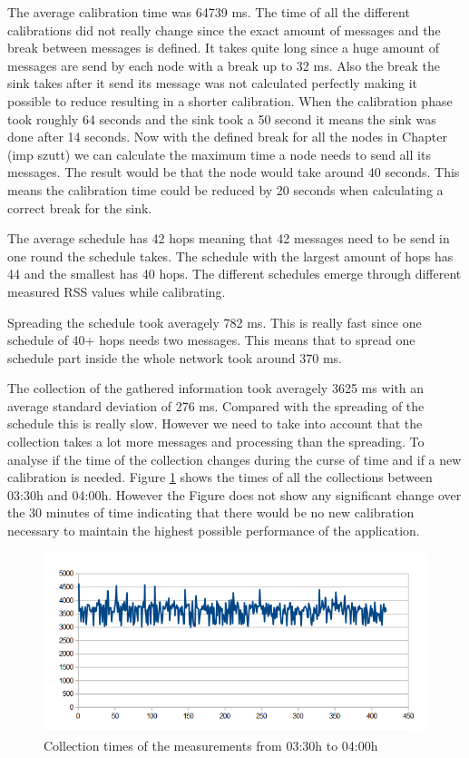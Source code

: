 The average calibration time was 64739 ms. The time of all the different calibrations did not really change since the exact amount of messages and the break between messages is defined. It takes quite long since a huge amount of messages are send by each node with a break up to 32 ms. Also the break the sink takes after it send its message was not calculated perfectly making it possible to reduce resulting in a shorter calibration. When the calibration phase took roughly 64 seconds and the sink took a 50 second it means the sink was done after 14 seconds. Now with the defined break for all the nodes in Chapter (imp szutt) we can calculate the maximum time a node needs to send all its messages. The result would be that the node would take around 40 seconds. This means the calibration time could be reduced by 20 seconds when calculating a correct break for the sink.

The average schedule has 42 hops meaning that 42 messages need to be send in one round the schedule takes. The schedule with the largest amount of hops has 44 and the smallest has 40 hops. The different schedules emerge through different measured RSS values while calibrating.

Spreading the schedule took averagely 782 ms. This is really fast since one schedule of 40+ hops needs two messages. This means that to spread one schedule part inside the whole network took around 370 ms.

The collection of the gathered information took averagely 3625 ms with an average standard deviation of 276 ms. Compared with the spreading of the schedule this is really slow. However we need to take into account that the collection takes a lot more messages and processing than the spreading. To analyse if the time of the collection changes during the curse of time and if a new calibration is needed. Figure \ref{fig:nightC} shows the times of all the collections between 03:30h and 04:00h. However the Figure does not show any significant change over the 30 minutes of time indicating that there would be no new calibration necessary to maintain the highest possible performance of the application.

\begin{figure}[htbp]
	\centering         
    \includegraphics[scale=0.75]{content/images/Experiment/NightCollection}
    \caption{Collection times of the measurements from 03:30h to 04:00h}
	\label{fig:nightC}
\end{figure}

